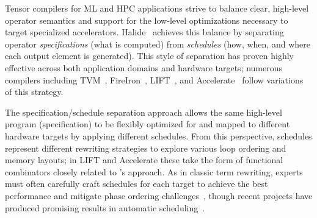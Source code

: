 

Tensor compilers for ML and HPC applications strive
  to balance clear, high-level operator semantics
  and support for the low-level optimizations
  necessary to target specialized accelerators.
Halide~\cite{halide}
  achieves this balance by separating
  operator \textit{specifications} (what is computed) from
  \textit{schedules} (how, when, and where
  each output element is generated).
This style of separation has proven
  highly effective across both
  application domains and hardware targets;
  numerous compilers including TVM~\cite{chen2018tvm},
  FireIron~\cite{hagedorn2020fireiron},
  LIFT~\cite{lift}, and Accelerate~\cite{accelerate}
  follow variations of this strategy.
  
The specification/schedule separation approach
  allows the same high-level program (specification)
  to be flexibly optimized for and mapped to
  different hardware targets by applying different schedules.
From this perspective,
  schedules represent different rewriting strategies
  to explore various loop ordering and memory layouts;
  in LIFT and Accelerate these
  take the form of functional combinators
  closely related to \g's approach.
As in classic term rewriting,
  experts must often carefully craft
  schedules for each target to achieve
  the best performance and mitigate
  phase ordering challenges~\cite{phase-ordering},
  though recent projects have produced promising results
  in automatic scheduling~\cite{
    chen2018autotvm, zheng2020ansor, anderson2020learning}.

